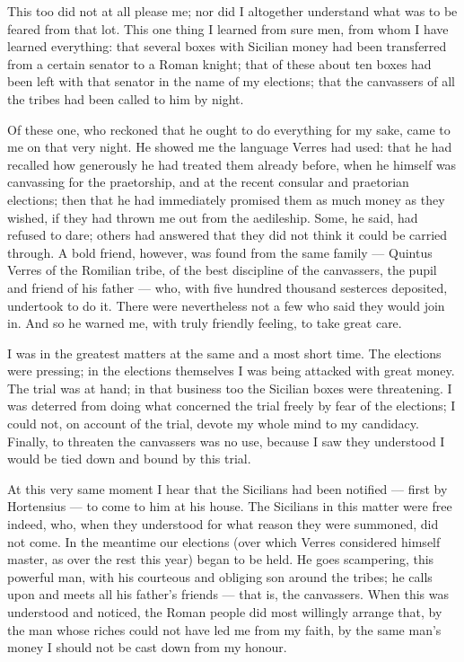  This too did not at all please me; nor did I altogether understand what was to be feared from that lot. This one thing I learned from sure men, from whom I have learned everything: that several boxes with Sicilian money had been transferred from a certain senator to a Roman knight; that of these about ten boxes had been left with that senator in the name of my elections; that the canvassers of all the tribes had been called to him by night.

 Of these one, who reckoned that he ought to do everything for my sake, came to me on that very night. He showed me the language Verres had used: that he had recalled how generously he had treated them already before, when he himself was canvassing for the praetorship, and at the recent consular and praetorian elections; then that he had immediately promised them as much money as they wished, if they had thrown me out from the aedileship. Some, he said, had refused to dare; others had answered that they did not think it could be carried through. A bold friend, however, was found from the same family --- Quintus Verres of the Romilian tribe, of the best discipline of the canvassers, the pupil and friend of his father --- who, with five hundred thousand sesterces deposited, undertook to do it. There were nevertheless not a few who said they would join in. And so he warned me, with truly friendly feeling, to take great care.

 I was in the greatest matters at the same and a most short time. The elections were pressing; in the elections themselves I was being attacked with great money. The trial was at hand; in that business too the Sicilian boxes were threatening. I was deterred from doing what concerned the trial freely by fear of the elections; I could not, on account of the trial, devote my whole mind to my candidacy. Finally, to threaten the canvassers was no use, because I saw they understood I would be tied down and bound by this trial.

 At this very same moment I hear that the Sicilians had been notified --- first by Hortensius --- to come to him at his house. The Sicilians in this matter were free indeed, who, when they understood for what reason they were summoned, did not come. In the meantime our elections (over which Verres considered himself master, as over the rest this year) began to be held. He goes scampering, this powerful man, with his courteous and obliging son around the tribes; he calls upon and meets all his father's friends --- that is, the canvassers. When this was understood and noticed, the Roman people did most willingly arrange that, by the man whose riches could not have led me from my faith, by the same man's money I should not be cast down from my honour.

